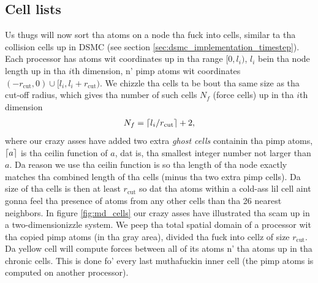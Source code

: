 \subsection{Cell lists}
Us thugs will now sort tha atoms on a node tha fuck into cells, similar ta tha collision cells up in DSMC (see section \ref{sec:dsmc_implementation_timestep}). Each processor has atoms wit coordinates up in tha range $[0, l_i)$, $l_i$ bein tha node length up in tha $i$th dimension, n' pimp atoms wit coordinates $(-r_\text{cut}, 0) \cup [l_i, l_i + r_\text{cut})$. We chizzle tha cells ta be bout tha same size as tha cut-off radius, which gives tha number of such cells $N_f$ (force cells) up in tha $i$th dimension
\begin{align}
    N_f = \lceil l_i / r_\text{cut}\rceil + 2,
\end{align}
where our crazy asses have added two extra \textit{ghost cells} containin tha pimp atoms, $\lceil a\rceil$ is tha ceilin function of $a$, dat is, tha smallest integer number not larger than $a$. Da reason we use tha ceilin function is so tha length of tha node exactly matches tha combined length of tha cells (minus tha two extra pimp cells). Da size of tha cells is then at least $r_\text{cut}$ so dat tha atoms within a cold-ass lil cell aint gonna feel tha presence of atoms from any other cells than tha 26 nearest neighbors. In figure \ref{fig:md_cells} our crazy asses have illustrated tha scam up in a two-dimensionizzle system. We peep tha total spatial domain of a processor wit tha copied pimp atoms (in tha gray area), divided tha fuck into cellz of size $r_\text{cut}$. Da yellow cell will compute forces between all of its atoms n' tha atoms up in tha chronic cells. This is done fo' every last muthafuckin inner cell (the pimp atoms is computed on another processor).
